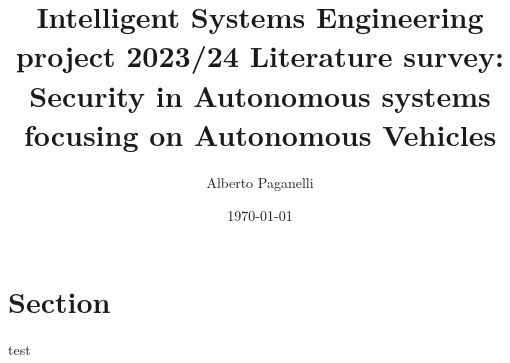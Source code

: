 \documentclass{scrartcl}
\title{\LARGE
Intelligent Systems Engineering project 2023/24 \newline
\newline
Literature survey: \\
Security in Autonomous systems focusing on Autonomous Vehicles
}
\author{
    Alberto Paganelli \\ \emailaddr{alberto.paganelli3@studio.unibo.it}
}
\date{\today}
\begin{document}
    \maketitle

    \begin{abstract}


    \end{abstract}

    \newpage

    \tableofcontents

    \newpage

    \section{Section}
    test~\nocite{*}
    
    
\end{document}
